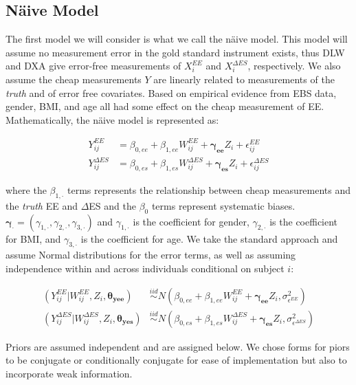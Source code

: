 \documentclass[11pt]{article}\usepackage[]{graphicx}\usepackage[]{color}
\begin{document}
\subsection{N{\"a}ive Model}

The first model we will consider is what we call the n{\"a}ive model. This model will assume no measurement error in the gold standard instrument exists,  thus DLW and DXA give error-free measurements of $X_i^{EE}$ and $X_i^{\Delta ES}$, respectively. We also assume the cheap measurements $Y$ are linearly related to measurements of the \emph{truth} and of error free covariates. Based on empirical evidence from EBS data, gender, BMI, and age all had some effect on the cheap measurement of EE.  Mathematically, the n{\"a}ive model is represented as:

\begin{align}
Y_{ij}^{EE} &= \beta_{0,ee} + \beta_{1,ee}W_{ij}^{EE}+ \boldsymbol{\gamma_{ee}}Z_i + \epsilon_{ij}^{EE} \\
Y_{ij}^{\Delta ES} &= \beta_{0,es} + \beta_{1,es}W_{ij}^{\Delta ES}+ \boldsymbol{\gamma_{es}}Z_i + \epsilon_{ij}^{\Delta ES} 
\end{align}

where the $\beta_{1,\cdot}$ terms represents the relationship between cheap measurements and the \emph{truth} EE and $\Delta$ES and the $\beta_0$ terms represent systematic biases. $\boldsymbol{\gamma_{\cdot}}=(\gamma_{1,\cdot},\gamma_{2,\cdot},\gamma_{3,\cdot})$ and $\gamma_{1,\cdot}$ is the coefficient for gender, $\gamma_{2,\cdot}$ is the coefficient for BMI, and $\gamma_{3,\cdot}$ is the coefficient for age. We take the standard approach and assume Normal distributions for the error terms, as well as assuming independence within and across individuals conditional on subject $i$:

\begin{align}
  \label{ymodel0}
  (Y_{ij}^{EE} | W_{ij}^{EE},Z_i,\boldsymbol{\theta_{yee}}) &\overset{iid}{\sim} N(\beta_{0,ee} + \beta_{1,ee}W_{ij}^{EE}+ \boldsymbol{\gamma_{ee}}Z_i,\sigma_{\epsilon^{EE}}^2) \\
  \label{ymodel0b}
  (Y_{ij}^{\Delta ES} | W_{ij}^{\Delta ES},Z_i,\boldsymbol{\theta_{yes}}) &\overset{iid}{\sim} N(\beta_{0,es} + \beta_{1,es}W_{ij}^{\Delta ES}+ \boldsymbol{\gamma_{es}}Z_i,\sigma_{\epsilon^{\Delta ES}}^2)
\end{align}

Priors are assumed independent and are assigned below. We chose forms for piors to be conjugate or conditionally conjugate for ease of implementation but also to incorporate weak information. 
\end{document}
